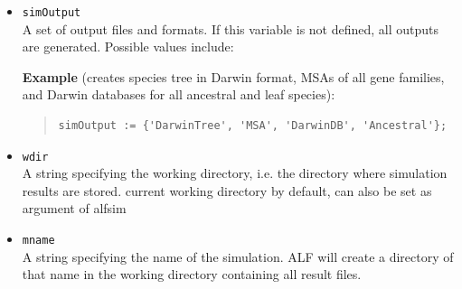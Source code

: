 \documentclass[11pt]{article}
\begin{document}
\begin{itemize}
\item{\texttt{simOutput}} \hfill \\
A set of output files and formats. If this variable is not defined, all outputs are generated. Possible values include:

\noindent \textbf{Example} (creates species tree in Darwin format, MSAs of all gene families, and Darwin databases for all ancestral and leaf species):
\begin{quote}
\begin{verbatim}
simOutput := {'DarwinTree', 'MSA', 'DarwinDB', 'Ancestral'};
\end{verbatim}
\end{quote}

\item{\texttt{wdir}} \hfill \\
A string specifying the working directory, i.e. the directory where simulation results are stored. current working directory by default, can also be set as argument of alfsim

\item{\texttt{mname}} \hfill \\
A string specifying the name of the simulation. ALF will create a directory of that name in the working directory containing all result files.
\end{itemize}
\end{document}
